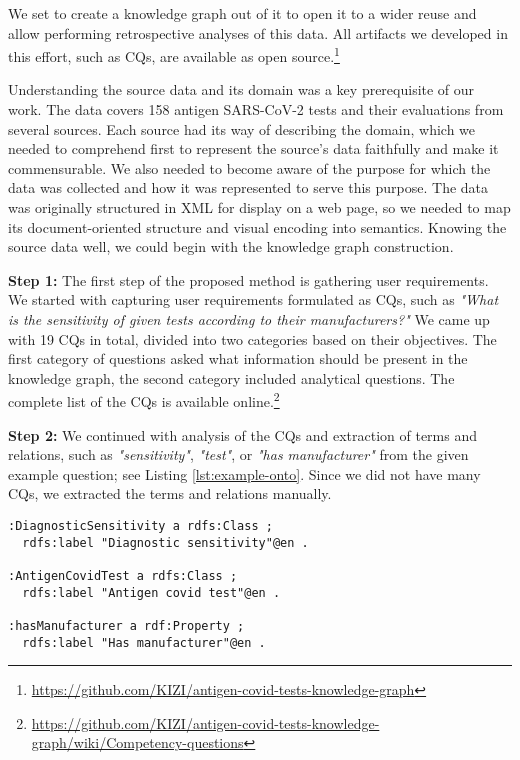 \documentclass[
]{ceurart}
\begin{document}
We set to create a knowledge graph out of it to open it to a wider reuse and allow performing retrospective analyses of this data. 
All artifacts we developed in this effort, such as CQs, are available as open source.\footnote{\url{https://github.com/KIZI/antigen-covid-tests-knowledge-graph}}

Understanding the source data and its domain was a key prerequisite of our work. The data covers 158 antigen SARS-CoV-2 tests and their evaluations from several sources. Each source had its way of describing the domain, which we needed to comprehend first to represent the source's data faithfully and make it commensurable. We also needed to become aware of the purpose for which the data was collected and how it was represented to serve this purpose. The data was originally structured in XML for display on a web page, so we needed to map its document-oriented structure and visual encoding into semantics. Knowing the source data well, we could begin with the knowledge graph construction.

\textbf{Step 1:} The first step of the proposed method is gathering user requirements. We started with capturing user requirements formulated as CQs, such as \textit{"What is the sensitivity of given tests according to their manufacturers?"} We came up with 19 CQs in total, divided into two categories based on their objectives. The first category of questions asked what information should be present in the knowledge graph, the second category included analytical questions. The complete list of the CQs is available online.\footnote{\url{https://github.com/KIZI/antigen-covid-tests-knowledge-graph/wiki/Competency-questions}}

\textbf{Step 2:} We continued with analysis of the CQs and extraction of terms and relations, such as \textit{"sensitivity"}, \textit{"test"}, or \textit{"has manufacturer"} from the given example question; see Listing \ref{lst:example-onto}. Since we did not have many CQs, we extracted the terms and relations manually.

\begin{lstlisting}[language=turtle, caption=Example ontology terms, label={lst:example-onto}]
:DiagnosticSensitivity a rdfs:Class ;
  rdfs:label "Diagnostic sensitivity"@en .
  
:AntigenCovidTest a rdfs:Class ;
  rdfs:label "Antigen covid test"@en .
  
:hasManufacturer a rdf:Property ;
  rdfs:label "Has manufacturer"@en .
\end{lstlisting}
\end{document}
